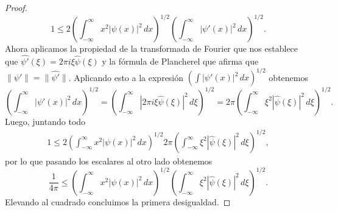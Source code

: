 \documentclass[12pt]{article}
\theoremstyle{plain}
\theoremstyle{definition}
\numberwithin{equation}{section}
\begin{document}
\begin{proof}
            \begin{equation*}
                1 \le 2 \left( \int_{-\infty}^{\infty} x^2 \left\lvert \psi(x) \right\rvert^2 \,dx \right)^{1/2} \left( \int_{-\infty}^{\infty} \left\lvert \psi'(x) \right\rvert^2 \,dx \right)^{1/2}.
            \end{equation*}
            Ahora aplicamos la propiedad de la transformada de Fourier que nos establece que \(\widehat{\psi'}(\xi) =\allowbreak 2\pi i\xi \hat{\psi}(\xi)\) y la fórmula de Plancherel que afirma que \(\lVert \psi' \rVert = \lVert \widehat{\psi'} \rVert\). Aplicando esto a la expresión
            \(\left(\int \left\lvert \psi'(x) \right\rvert^2 \,dx\right)^{1/2}\) obtenemos
            \begin{equation*}
                \left( \int_{-\infty}^{\infty} \left\lvert \psi'(x) \right\rvert^2 \,dx \right)^{1/2} = \left( \int_{-\infty}^{\infty} \left\lvert 2\pi i\xi \hat{\psi}(\xi) \right\rvert^2 \,d\xi \right)^{1/2} = 2\pi \left( \int_{-\infty}^{\infty} \xi^2 \left\lvert \hat{\psi}(\xi) \right\rvert^2 \,d\xi \right)^{1/2}.
            \end{equation*}
            Luego, juntando todo
            \begin{align*}
                1 \le 2 \left( \int_{-\infty}^{\infty} x^2 \left\lvert \psi(x) \right\rvert^2 \,dx \right)^{1/2} 2\pi \left( \int_{-\infty}^{\infty} \xi^2 \left\lvert \hat{\psi}(\xi) \right\rvert^2 \,d\xi \right)^{1/2}, 
            \end{align*}
            por lo que pasando los escalares al otro lado obtenemos $$ \frac{1}{4\pi} \le \left( \int_{-\infty}^{\infty} x^2 \left\lvert \psi(x) \right\rvert^2 \,dx \right)^{1/2} \left( \int_{-\infty}^{\infty} \xi^2 \left\lvert \hat{\psi}(\xi) \right\rvert^2 \,d\xi \right)^{1/2}. $$
            Elevando al cuadrado concluimos la primera desigualdad.


\end{proof}
\end{document}
